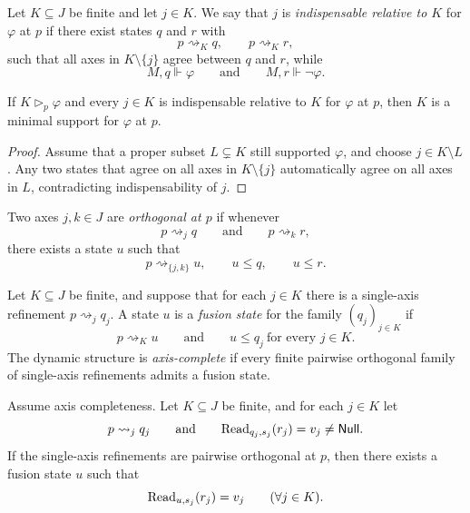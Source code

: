 \begin{definition}[Indispensability]\label{def:axis-indispensability}
Let $K\subseteq J$ be finite and let $j\in K$. We say that $j$ is \emph{indispensable relative to $K$} for $\varphi$ at $p$ if there exist states $q$ and $r$ with
\[
p\rightsquigarrow_K q,\qquad
p\rightsquigarrow_K r,
\]
such that all axes in $K\setminus\{j\}$ agree between $q$ and $r$, while
\[
M,q\Vdash\varphi
\qquad\text{and}\qquad
M,r\Vdash\neg\varphi.
\]
\end{definition}

\begin{proposition}\label{prop:indispensability-implies-minimality}
If $K\triangleright_p\varphi$ and every $j\in K$ is indispensable relative to $K$ for $\varphi$ at $p$, then $K$ is a minimal support for $\varphi$ at $p$.
\end{proposition}

\begin{proof}
Assume that a proper subset $L\subsetneq K$ still supported $\varphi$, and choose $j\in K\setminus L$. Any two states that agree on all axes in $K\setminus\{j\}$ automatically agree on all axes in $L$, contradicting indispensability of $j$.
\end{proof}

\begin{definition}[Orthogonality]\label{def:axis-orthogonality}
Two axes $j,k\in J$ are \emph{orthogonal at $p$} if whenever
\[
p\rightsquigarrow_j q
\qquad\text{and}\qquad
p\rightsquigarrow_k r,
\]
there exists a state $u$ such that
\[
p\rightsquigarrow_{\{j,k\}} u,
\qquad
u\le q,
\qquad
u\le r.
\]
\end{definition}

\begin{definition}\label{def:fusion-state}
Let $K\subseteq J$ be finite, and suppose that for each $j\in K$ there is a single-axis refinement $p\rightsquigarrow_j q_j$. A state $u$ is a \emph{fusion state} for the family $(q_j)_{j\in K}$ if
\[
p\rightsquigarrow_K u
\qquad\text{and}\qquad
u\le q_j\ \text{for every }j\in K.
\]
The dynamic structure is \emph{axis-complete} if every finite pairwise orthogonal family of single-axis refinements admits a fusion state.
\end{definition}

\begin{corollary}\label{cor:explicit-lifting}
Assume axis completeness. Let $K\subseteq J$ be finite, and for each $j\in K$ let
\[
p\rightsquigarrow_j q_j
\qquad\text{and}\qquad
\mathrm{Read}_{q_j,s_j}(r_j)=v_j\neq \mathsf{Null}.
\]
If the single-axis refinements are pairwise orthogonal at $p$, then there exists a fusion state $u$ such that
\[
\mathrm{Read}_{u,s_j}(r_j)=v_j
\qquad
(\forall j\in K).
\]
\end{corollary}

